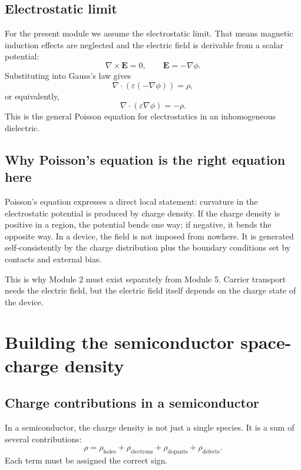 \documentclass[11pt]{article}
\newcommand{\Evec}{\mathbf{E}}
\begin{document}
\subsection{Electrostatic limit}

For the present module we assume the electrostatic limit. That means magnetic induction effects are neglected and the electric field is derivable from a scalar potential:
\begin{equation}
\nabla \times \Evec = 0, \qquad \Evec = -\nabla \phi.
\end{equation}
Substituting into Gauss's law gives
\begin{equation}
\nabla \cdot (\varepsilon (-\nabla \phi)) = \rho,
\end{equation}
or equivalently,
\begin{equation}
\nabla \cdot (\varepsilon \nabla \phi) = -\rho.
\end{equation}
This is the general Poisson equation for electrostatics in an inhomogeneous dielectric.

\subsection{Why Poisson's equation is the right equation here}

Poisson's equation expresses a direct local statement: curvature in the electrostatic potential is produced by charge density. If the charge density is positive in a region, the potential bends one way; if negative, it bends the opposite way. In a device, the field is not imposed from nowhere. It is generated self-consistently by the charge distribution plus the boundary conditions set by contacts and external bias.

This is why Module 2 must exist separately from Module 5. Carrier transport needs the electric field, but the electric field itself depends on the charge state of the device.

\section{Building the semiconductor space-charge density}

\subsection{Charge contributions in a semiconductor}

In a semiconductor, the charge density is not just a single species. It is a sum of several contributions:
\begin{equation}
\rho = \rho_{\text{holes}} + \rho_{\text{electrons}} + \rho_{\text{dopants}} + \rho_{\text{defects}}.
\end{equation}
Each term must be assigned the correct sign.
\end{document}
